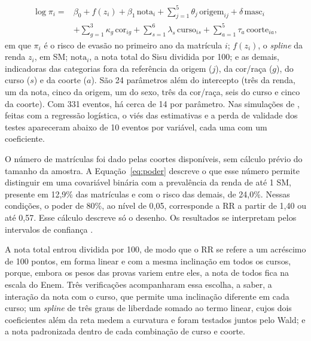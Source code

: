 \documentclass[12pt,a4paper]{article}
\begin{document}
\begin{equation}
\begin{split}
  \log \pi_i = {}& \beta_0 + f(z_i) + \beta_1\,\text{nota}_i + \textstyle\sum_{j=1}^{5}\theta_j\,\text{origem}_{ij} + \delta\,\text{masc}_i \\
  & + \textstyle\sum_{g=1}^{3}\kappa_g\,\text{cor}_{ig} + \sum_{s=1}^{6}\lambda_s\,\text{curso}_{is} + \sum_{a=1}^{5}\tau_a\,\text{coorte}_{ia},
\end{split}
\label{eq:modelo}
\end{equation}
em que $\pi_i$ é o risco de evasão no primeiro ano da matrícula $i$; $f(z_i)$, o \textit{spline} da renda $z_i$, em SM; $\text{nota}_i$, a nota total do Sisu dividida por 100; e as demais, indicadoras das categorias fora da referência da origem ($j$), da cor/raça ($g$), do curso ($s$) e da coorte ($a$). São 24 parâmetros além do intercepto (três da renda, um da nota, cinco da origem, um do sexo, três da cor/raça, seis do curso e cinco da coorte). Com 331 eventos, há cerca de 14 por parâmetro. Nas simulações de \citet{peduzzi1996simulation}, feitas com a regressão logística, o viés das estimativas e a perda de validade dos testes apareceram abaixo de 10 eventos por variável, cada uma com um coeficiente.

O número de matrículas foi dado pelas coortes disponíveis, sem cálculo prévio do tamanho da amostra. A Equação~\eqref{eq:poder} descreve o que esse número permite distinguir em uma covariável binária com a prevalência da renda de até 1 SM, presente em 12,9\% das matrículas e com o risco das demais, de 24,0\%. Nessas condições, o poder de 80\%, ao nível de 0,05, corresponde a RR a partir de 1,40 ou até 0,57. Esse cálculo descreve só o desenho. Os resultados se interpretam pelos intervalos de confiança \citep{hoenig2001abuse}.

A nota total entrou dividida por 100, de modo que o RR se refere a um acréscimo de 100 pontos, em forma linear e com a mesma inclinação em todos os cursos, porque, embora os pesos das provas variem entre eles, a nota de todos fica na escala do Enem. Três verificações acompanharam essa escolha, a saber, a interação da nota com o curso, que permite uma inclinação diferente em cada curso; um \textit{spline} de três graus de liberdade somado ao termo linear, cujos dois coeficientes além da reta medem a curvatura e foram testados juntos pelo Wald; e a nota padronizada dentro de cada combinação de curso e coorte.
\end{document}
